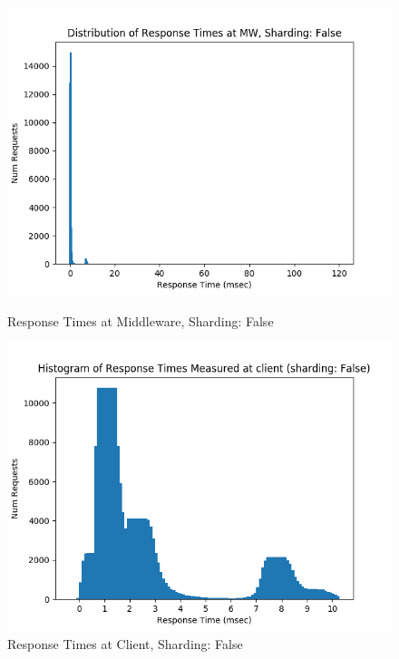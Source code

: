 \documentclass[11pt,a4paper]{article}
\begin{document}
\begin{figure}[H]
	\captionsetup{font=scriptsize,labelfont=scriptsize,justification=centering}
	\centering
	\begin{minipage}{0.5\textwidth}
		\centering
		\includegraphics[scale=0.525]{images/5_mw_hist_shard_False.png}
		\caption{Response Times at Middleware, Sharding: False}
	\end{minipage}\hfill
	\begin{minipage}{0.5\textwidth}
		\centering
		\includegraphics[scale=0.525]{images/5_mt_hist_shard_False.png}
		\caption{Response Times at Client, Sharding: False}
	\end{minipage}
\end{figure}
\end{document}
